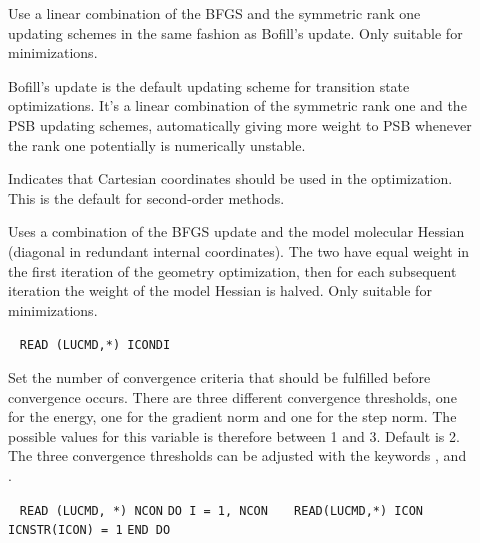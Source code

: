 \begin{description}
\item[]
Use a linear combination of the BFGS and the symmetric rank one
updating schemes in the same fashion as Bofill's update. Only suitable
for minimizations.

\item[]
Bofill's update\cite{jmbjcc15}
is the default updating scheme for
transition state optimizations. It's a linear combination of the
symmetric rank one and the PSB updating schemes, automatically giving
more weight to PSB whenever the rank one potentially is numerically
unstable.

\item[]
Indicates that Cartesian coordinates
should be used in the optimization. This is the default for
second-order methods.

\item[]
Uses a combination of the BFGS update and the model molecular Hessian (diagonal
in redundant internal coordinates). The two have equal weight in the
first iteration of the geometry optimization, then for each subsequent
iteration the weight of the model Hessian is halved. Only suitable for
minimizations.

\item[]\verb| |
\newline
\verb|READ (LUCMD,*) ICONDI|

Set the number of convergence criteria
that should be fulfilled before
convergence occurs. There are three different convergence thresholds,
one for the energy, one for the gradient
norm and one for the step
norm.
The possible values for this variable is therefore between 1 and
3. Default is 2. The three convergence thresholds can be adjusted with
the keywords ,  and .

\item[]\verb| |\newline
\verb|READ (LUCMD, *) NCON|\newline
\verb|DO I = 1, NCON|\newline
\verb|   READ(LUCMD,*) ICON|\newline
\verb|   ICNSTR(ICON) = 1|\newline
\verb|END DO|


\end{description}
